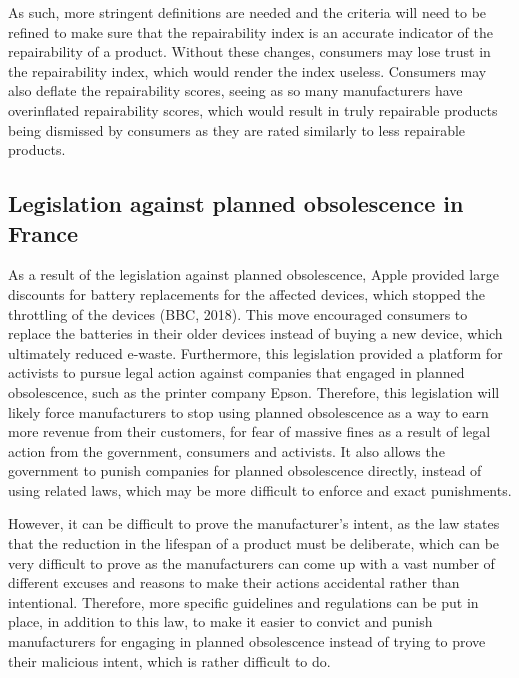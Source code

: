 \documentclass[11pt]{article}
\makeatletter
\newcommand{\citeprocitem}[2]{\hyper@linkstart{cite}{citeproc_bib_item_#1}#2\hyper@linkend}
\makeatother
\begin{document}
 \newpage

 \noindent As such, more stringent definitions are needed and the criteria will need to be refined to make sure that the repairability index is an accurate indicator of the repairability of a product. Without these changes, consumers may lose trust in the repairability index, which would render the index useless. Consumers may also deflate the repairability scores, seeing as so many manufacturers have overinflated repairability scores, which would result in truly repairable products being dismissed by consumers as they are rated similarly to less repairable products.

\subsection{Legislation against planned obsolescence in France}
\label{sec:org2d44e6f}
As a result of the legislation against planned obsolescence, Apple provided large discounts for battery replacements for the affected devices, which stopped the throttling of the devices (\citeprocitem{3}{BBC, 2018}). This move encouraged consumers to replace the batteries in their older devices instead of buying a new device, which ultimately reduced e-waste. Furthermore, this legislation provided a platform for activists to pursue legal action against companies that engaged in planned obsolescence, such as the printer company Epson. Therefore, this legislation will likely force manufacturers to stop using planned obsolescence as a way to earn more revenue from their customers, for fear of massive fines as a result of legal action from the government, consumers and activists. It also allows the government to punish companies for planned obsolescence directly, instead of using related laws, which may be more difficult to enforce and exact punishments.

 \newpage

 \noindent However, it can be difficult to prove the manufacturer's intent, as the law states that the reduction in the lifespan of a product must be deliberate, which can be very difficult to prove as the manufacturers can come up with a vast number of different excuses and reasons to make their actions accidental rather than intentional. Therefore, more specific guidelines and regulations can be put in place, in addition to this law, to make it easier to convict and punish manufacturers for engaging in planned obsolescence instead of trying to prove their malicious intent, which is rather difficult to do.
\end{document}
